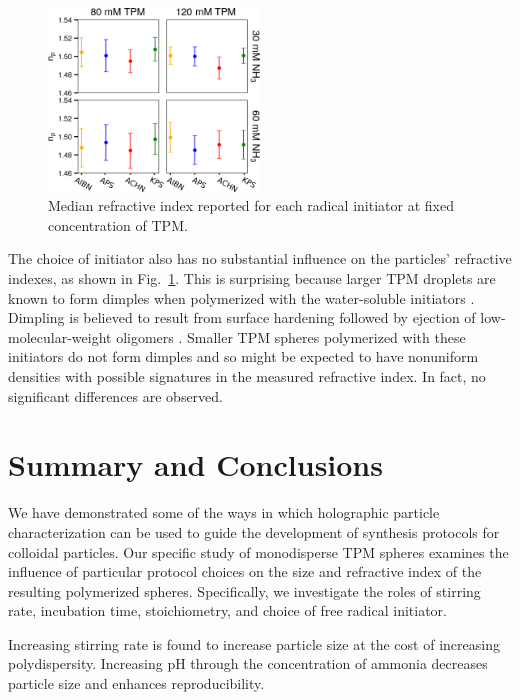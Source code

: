 \documentclass[journal=langd5,manuscript=article]{achemso}
\providecommand{\DIFadd}[1]{{\protect\color{blue}\uwave{#1}}} %
\providecommand{\DIFaddbegin}{} %
\providecommand{\DIFaddend}{} %
\begin{document}
\begin{figure}
    \centering
    \includegraphics[width=0.5\textwidth]{longitudinal_np_02}
    \caption{Median refractive index reported for each radical initiator
    at fixed concentration of TPM.}
    \label{fig:longitudinal_np}
\end{figure}

The choice of initiator also has no substantial
influence on the particles' refractive indexes,
as shown in Fig.~\ref{fig:longitudinal_np}.
This is surprising because
larger TPM droplets are known to form dimples when polymerized
with the water-soluble initiators \cite{sacanna11}.
Dimpling is believed to result from
surface hardening followed by
ejection of low-molecular-weight oligomers \cite{sacanna11}.
Smaller TPM spheres polymerized with these
initiators do not form dimples \DIFaddbegin \DIFadd{\mbox{%
\cite{vanderwel17}
}\hspace{0pt}%
}\DIFaddend and so might 
be expected to have nonuniform densities
with possible signatures in the measured refractive
index.  In fact, no significant differences are observed.

\section{Summary and Conclusions}
\label{sec:discussion}

We have demonstrated some of the ways in which 
holographic particle characterization
can be used to guide the development of synthesis
protocols for colloidal particles.
Our specific study of monodisperse TPM spheres
examines the influence of particular protocol
choices on the size and refractive index of 
the resulting polymerized spheres. Specifically,
we investigate the roles of stirring rate, 
incubation time, stoichiometry, and choice of
free radical initiator.

Increasing stirring rate is found to increase particle
size at the cost of increasing polydispersity.
Increasing pH through the concentration of ammonia 
decreases particle size and enhances 
reproducibility.
\end{document}
